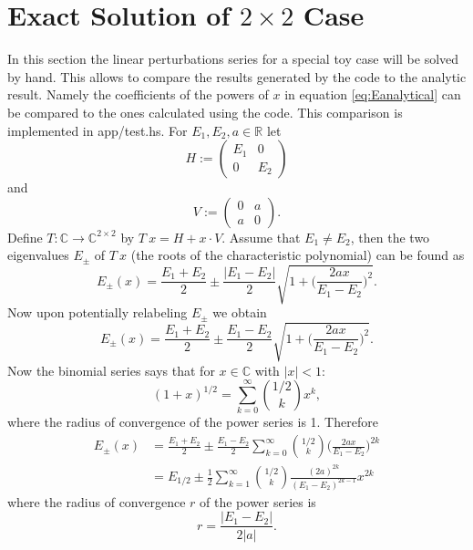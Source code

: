 \documentclass[11pt, a4paper]{article} %
\numberwithin{equation}{subsection} %
\theoremstyle{definition} %
\theoremstyle{plain} %
\begin{document}
\section{Exact Solution of $2 \times 2$ Case}
In this section the linear perturbations series for a special toy case will be solved by hand.
This allows to compare the results generated by the code to the analytic result.
Namely the coefficients of the powers of $x$ in equation \ref{eq:Eanalytical}
can be compared to the ones calculated using the code.
This comparison is implemented in app/test.hs.
For $E_1, E_2, a \in \mathbb{R}$
let
$$H:=
	\begin{pmatrix}
		E_1 & 0   \\
		0   & E_2
	\end{pmatrix}$$
and
$$
	V :=
	\begin{pmatrix}
		0 & a \\
		a & 0
	\end{pmatrix}.
$$
Define $T: \mathbb{C} \to \mathbb{C}^{2 \times 2}$
by $T \ x =  H + x \cdot V$.
Assume that $E_1 \neq E_2$, then
the two eigenvalues $E_\pm$ of $T \  x$ (the roots of the characteristic polynomial) can be found as
\begin{equation}
	E_\pm (x) =  \frac{E_{1}+ E_2}{2}
	\pm \frac{|E_1 -E_2|}{2} \sqrt{
		1 + \bigg(\frac{2 a x}{E_1-E_2}\bigg)^2
	}.
\end{equation}
Now upon potentially relabeling $E_\pm$ we obtain
\begin{equation}
	E_\pm (x) =  \frac{E_{1}+ E_2}{2}
	\pm \frac{E_1 -E_2}{2} \sqrt{
		1 + \bigg(\frac{2 a x}{E_1-E_2}\bigg)^2
	}.
\end{equation}
Now the binomial series says that for $x \in \mathbb{C}$ with $|x|<1$:
\begin{equation}
	(1+x)^{1/2} = \sum_{k=0}^\infty
	{1/2 \choose k} x^k,
\end{equation}
where the radius of convergence of the power series is 1.
Therefore
\begin{equation}
	\label{eq:Eanalytical}
	\begin{split}
		E_\pm (x) &=  \frac{E_{1}+ E_2}{2}
		\pm \frac{E_1 -E_2}{2} \sum_{k=0}^\infty
		{1/2 \choose k} \bigg(\frac{2 a x}{E_1-E_2}\bigg)^{2k} \\
		&= E_{1/2} \pm \frac{1}{2} \sum_{k=1}^\infty
		{1/2 \choose k} \frac{(2 a)^{2k}}{(E_1-E_2)^{2k-1}} x^{2k}
	\end{split}
\end{equation}
where the radius of convergence $r$ of the power series is
\begin{equation}
	r = \frac{|E_1 -E_2|}{2 |a|}.
\end{equation}
\printbibliography %
\end{document}

